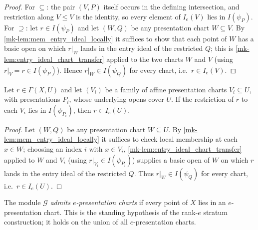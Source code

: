 \begin{proof}
  \leanok
  For \(\subseteq\): the pair \((V, P)\) itself occurs in the defining
  intersection, and restriction along \(V \le V\) is the identity, so every
  element of \(I_e(V)\) lies in \(I(\psi_P)\).  For \(\supseteq\): let
  \(r \in I(\psi_P)\) and let \((W, Q)\) be any presentation chart
  \(W \subseteq V\).  By \ref{mk-lem:mem_entry_ideal_locally} it suffices to
  show that each point of \(W\) has a basic open on which \(r|_W\) lands in the
  entry ideal of the restricted \(Q\); this is
  \ref{mk-lem:entry_ideal_chart_transfer} applied to the two charts \(W\) and
  \(V\) (using \(r|_V = r \in I(\psi_P)\)).  Hence \(r|_W \in I(\psi_Q)\) for
  every chart, i.e.\ \(r \in I_e(V)\).
\end{proof}

\begin{lemma}
  \label{mk-lem:mem_strata_ideal_of_charts}
  \leanok

  Let \(r \in \Gamma(X, U)\) and let \((V_i)\) be a family of affine
  presentation charts \(V_i \subseteq U\), with presentations \(P_i\), whose
  underlying opens cover \(U\).  If the restriction of \(r\) to each \(V_i\)
  lies in \(I(\psi_{P_i})\), then \(r \in I_e(U)\).
\end{lemma}

\begin{proof}
  \leanok
  Let \((W, Q)\) be any presentation chart \(W \subseteq U\).  By
  \ref{mk-lem:mem_entry_ideal_locally} it suffices to check local membership at
  each \(x \in W\); choosing an index \(i\) with \(x \in V_i\),
  \ref{mk-lem:entry_ideal_chart_transfer} applied to \(W\) and \(V_i\) (using
  \(r|_{V_i} \in I(\psi_{P_i})\)) supplies a basic open of \(W\) on which
  \(r\) lands in the entry ideal of the restricted \(Q\).  Thus
  \(r|_W \in I(\psi_Q)\) for every chart, i.e.\ \(r \in I_e(U)\).
\end{proof}

\begin{definition}
  \label{mk-def:charts_cover}
  \leanok

  The module \(\mathcal G\) \emph{admits \(e\)-presentation charts} if every
  point of \(X\) lies in an \(e\)-presentation chart.  This is the standing
  hypothesis of the rank-\(e\) stratum construction; it holds on the union of
  all \(e\)-presentation charts.
\end{definition}


